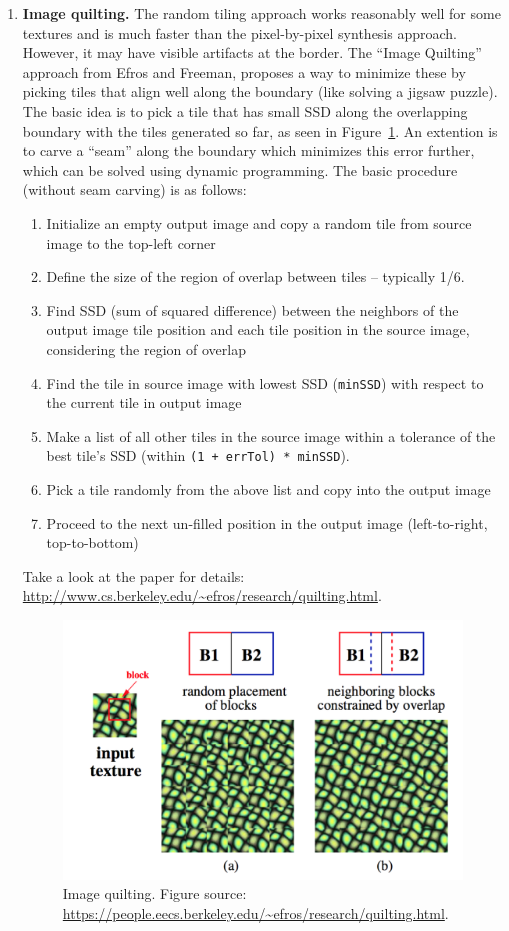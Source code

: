 \documentclass[10pt,letterpaper]{article}
\begin{document}
\begin{itemize}
\begin{enumerate}
\item \textbf{Image quilting.} The random tiling approach works
  reasonably well for some textures and is much faster than the
  pixel-by-pixel synthesis approach. 
  However, it may have visible artifacts at the border. 
  The ``Image Quilting'' approach from Efros and Freeman, proposes a
  way to minimize these by picking tiles that align well along the
  boundary (like solving a jigsaw puzzle).
  The basic idea is to pick a tile that has small SSD along the
  overlapping boundary with the tiles generated so far, as seen in Figure~\ref{fig:quilt}.
  An extention is to carve a ``seam'' along the boundary which
  minimizes this error further, which can be solved using dynamic programming. 
  The basic procedure (without seam carving) is as follows:
\begin{enumerate}
  \item Initialize an empty output image and copy a random tile from source image to the top-left corner
  \item Define the size of the region of overlap between tiles -- typically 1/6.
  \item Find SSD (sum of squared difference) between the neighbors of the output image tile position and each tile position in the source image, considering the region of overlap
  \item Find the tile in source image with lowest SSD (\texttt{minSSD}) with respect to the current tile in output image
  \item Make a list of all other tiles in the source image within a tolerance of the best tile's SSD (within \texttt{(1 + errTol) * minSSD}). 
\item Pick a tile randomly from the above list and copy into the output image
\item Proceed to the next un-filled position in the output image (left-to-right, top-to-bottom)
\end{enumerate}

Take a look at the paper for details:
  \url{http://www.cs.berkeley.edu/~efros/research/quilting.html}.

\begin{figure}
\centering
\includegraphics[width=0.6\linewidth]{image_quilt_fig.png}
\caption{\label{fig:quilt} Image quilting. Figure source:
  \url{https://people.eecs.berkeley.edu/~efros/research/quilting.html}.}
\end{figure}



\end{enumerate}
\end{itemize}
\end{document}
